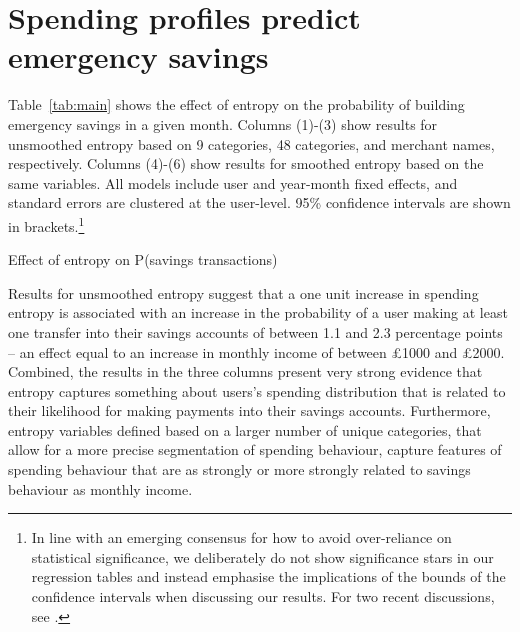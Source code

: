 
\section{Spending profiles predict emergency savings}%
\label{sec:results}

Table~\ref{tab:main} shows the effect of entropy on the probability of building
emergency savings in a given month. Columns (1)-(3) show results for unsmoothed
entropy based on 9 categories, 48 categories, and merchant names, respectively.
Columns (4)-(6) show results for smoothed entropy based on the same variables.
All models include user and year-month fixed effects, and standard errors are
clustered at the user-level. 95\% confidence intervals are shown in
brackets.\footnote{In line with an emerging consensus for how to avoid
    over-reliance on statistical significance, we deliberately do not show
    significance stars in our regression tables and instead emphasise the
    implications of the bounds of the confidence intervals when discussing our
    results. For two recent discussions, see \citet{imbens2021statistical,
romer2020praise}.}

\begin{table}[ht]
\centering\tiny
\caption{Effect of entropy on P(savings transactions)}
\label{tab:main}

\end{table}

Results for unsmoothed entropy suggest that a one unit increase in spending
entropy is associated with an increase in the probability of a user making at
least one transfer into their savings accounts of between 1.1 and 2.3
percentage points -- an effect equal to an increase in monthly income of
between \pounds1000 and \pounds2000. Combined, the results in the three columns
present very strong evidence that entropy captures something about users's
spending distribution that is related to their likelihood for making payments
into their savings accounts. Furthermore, entropy variables defined based on a
larger number of unique categories, that allow for a more precise segmentation
of spending behaviour, capture features of spending behaviour that are as
strongly or more strongly related to savings behaviour as monthly income.

